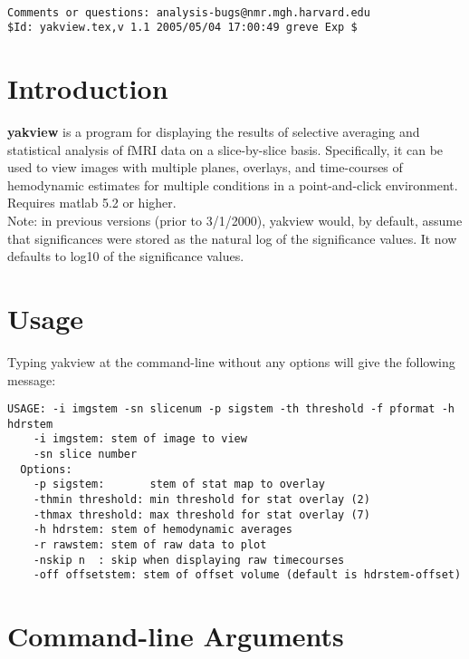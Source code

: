 \documentclass[10pt]{article}
\begin{document}
\begin{Large}
 \\
\end{Large}

\noindent 
\begin{verbatim}
Comments or questions: analysis-bugs@nmr.mgh.harvard.edu
$Id: yakview.tex,v 1.1 2005/05/04 17:00:49 greve Exp $
\end{verbatim}

\section{Introduction}
{\bf yakview} is a program for displaying the results of selective
averaging and statistical analysis of fMRI data on a slice-by-slice
basis. Specifically, it can be used to view images with multiple
planes, overlays, and time-courses of hemodynamic estimates for
multiple conditions in a point-and-click environment. Requires matlab
5.2 or higher.\\

Note: in previous versions (prior to 3/1/2000), yakview would, by
default, assume that significances were stored as the natural log of
the significance values.  It now defaults to log10 of the significance
values.

\section{Usage}
Typing yakview at the command-line without any options will give the
following message:\\ 

\begin{small}
\begin{verbatim}
USAGE: -i imgstem -sn slicenum -p sigstem -th threshold -f pformat -h hdrstem
    -i imgstem: stem of image to view
    -sn slice number
  Options:
    -p sigstem:       stem of stat map to overlay
    -thmin threshold: min threshold for stat overlay (2)
    -thmax threshold: max threshold for stat overlay (7)
    -h hdrstem: stem of hemodynamic averages
    -r rawstem: stem of raw data to plot
    -nskip n  : skip when displaying raw timecourses
    -off offsetstem: stem of offset volume (default is hdrstem-offset)
\end{verbatim}
\end{small}

\section{Command-line Arguments}
\end{document}
